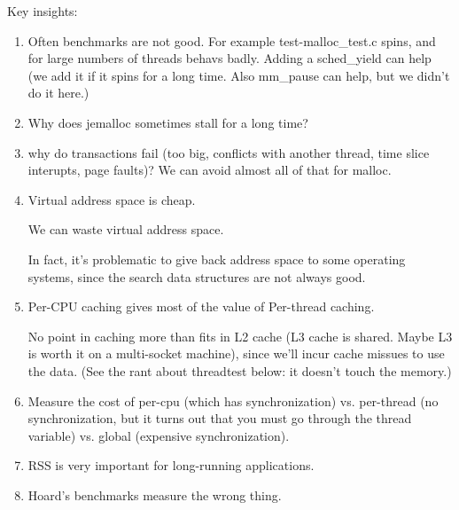 Key insights:
\begin{enumerate}
 \item Often benchmarks are not good.  For example test-malloc\_test.c spins, and for large numbers of threads behavs badly.  Adding a sched\_yield can help (we add it if it spins for a long time.  Also mm\_pause can help, but we didn't do it here.)
 \item  Why does jemalloc sometimes stall for a long time?  
 \item why do transactions fail (too big, conflicts with another thread, time slice interupts, page faults)?  We can avoid almost all of that for malloc.


 \item Virtual address space is cheap.  

 We can waste virtual address space.

 In fact, it's problematic to give back address space to some
 operating systems, since the search data structures are not always
 good.

 \item Per-CPU caching gives most of the value of Per-thread caching.

  No point in caching more than fits in L2 cache (L3 cache is shared.  Maybe L3 is worth it on a multi-socket machine), since we'll incur cache missues to use the data.  (See the rant about threadtest below: it doesn't touch the memory.)

 \item Measure the cost of per-cpu (which has synchronization) vs. per-thread (no synchronization, but it turns out that you must go through the thread variable) vs. global (expensive synchronization).

 \item RSS is very important for long-running applications.

 \item Hoard's benchmarks measure the wrong thing.
\end{enumerate}
